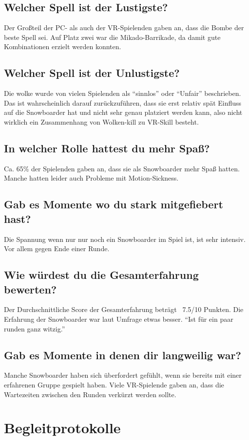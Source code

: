 \subsection{Welcher Spell ist der Lustigste?}
Der Großteil der PC- als auch der VR-Spielenden gaben an, dass die Bombe der beste Spell sei. Auf Platz zwei war die Mikado-Barrikade, da damit gute Kombinationen erzielt werden konnten.

\subsection{Welcher Spell ist der Unlustigste?}
Die wolke wurde von vielen Spielenden als "`sinnlos"' oder "`Unfair"' beschrieben. Das ist wahrscheinlich darauf zurückzuführen, dass sie erst relativ spät Einfluss auf die Snowboarder hat und nicht sehr genau platziert werden kann, also nicht wirklich ein Zusammenhang von Wolken-kill zu VR-Skill besteht.

\subsection{In welcher Rolle hattest du mehr Spaß?}
Ca. 65\% der Spielenden gaben an, dass sie als Snowboarder mehr Spaß hatten. Manche hatten leider auch Probleme mit Motion-Sickness.

\subsection{Gab es Momente wo du stark mitgefiebert hast?}
Die Spannung wenn nur nur noch ein Snowboarder im Spiel ist, ist sehr intensiv. Vor allem gegen Ende einer Runde.

\subsection{Wie würdest du die Gesamterfahrung bewerten?}
Der Durchschnittliche Score der Gesamterfahrung beträgt ~7.5/10 Punkten. Die Erfahrung der Snowboarder war laut Umfrage etwas besser. "`Ist für ein paar runden ganz witzig."'

\subsection{Gab es Momente in denen dir langweilig war?}
Manche Snowboarder haben sich überfordert gefühlt, wenn sie bereits mit einer erfahrenen Gruppe gespielt haben. Viele VR-Spielende gaben an, dass die Wartezeiten zwischen den Runden verkürzt werden sollte.

%

\section{Begleitprotokolle}
%
